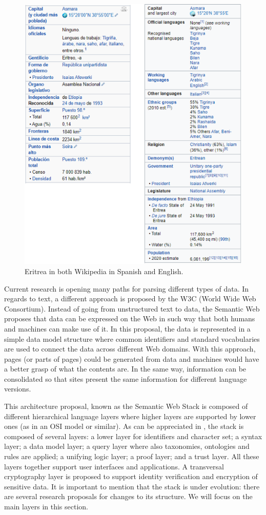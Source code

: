 \begin{figure}[!ht]
    \centering
        \includegraphics[width=.8\linewidth]{imagenes/EritreaWikipedia.png}
        \caption{Eritrea in both Wikipedia in Spanish and English.}
        \label{fig:eritreaWikipedia}
\end{figure}

Current research is opening many paths for parsing different types of data. In regards to text, a different approach is proposed by the W3C (World Wide Web Consortium). Instead of going from unstructured text to data, the Semantic Web proposes that data can be expressed on the Web in such way that both humans and machines can make use of it. In this proposal, the data is represented in a simple data model structure where common identifiers and standard vocabularies are used to connect the data across different Web domains. With this approach, pages (or parts of pages) could be generated from data and machines would have a better grasp of what the contents are. In the same way, information can be consolidated so that sites present the same information for different language versions.

This architecture proposal, known as the Semantic Web Stack is composed of different hierarchical language layers where higher layers are supported by lower ones (as in an OSI model or similar). As can be appreciated in , the stack is composed of several layers: a lower layer for identifiers and character set; a syntax layer; a data model layer; a query layer where also taxonomies, ontologies and rules are applied; a unifying logic layer; a proof layer; and a trust layer. All these layers together support user interfaces and applications. A transversal cryptography layer is proposed to support identity verification and encryption of sensitive data. It is important to mention that the stack is under evolution: there are several research proposals for changes to its structure. We will focus on the main layers in this section.

